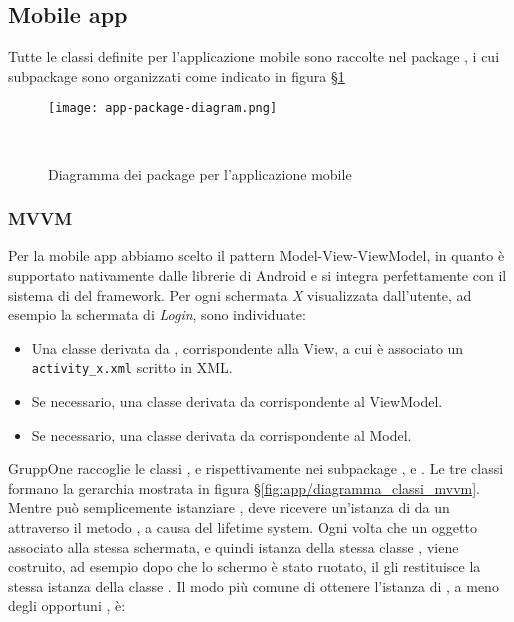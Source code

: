 \documentclass[../../manuale-manutentore.tex]{subfiles}
\begin{document}
\subsection{Mobile app}%
\label{sub:mobile_app}

Tutte le classi definite per l'applicazione mobile sono raccolte nel package , i cui subpackage sono organizzati come indicato in figura §\ref{fig:app/diagramma_package}
\begin{figure}[ht]
  \centering
  \texttt{[image: app-package-diagram.png]}
  \caption{Diagramma dei package per l'applicazione mobile}
~~\label{fig:app/diagramma_package}
\end{figure}

\subsubsection{MVVM}%
\label{subs:mvvm}

Per la mobile app abbiamo scelto il pattern Model-View-ViewModel, in quanto è supportato nativamente dalle librerie di Android e si integra perfettamente con il sistema di  del framework. Per ogni schermata \textit{X} visualizzata dall'utente, ad esempio la schermata di \textit{Login}, sono individuate:
\begin{itemize}
  \item Una classe  derivata da , corrispondente alla View, a cui è associato un  \linebreak[1]\texttt{activity\_x.xml} scritto in XML\@.
  \item Se necessario, una classe  derivata da  corrispondente al ViewModel.
  \item Se necessario, una classe  derivata da  corrispondente al Model.
\end{itemize}

GruppOne raccoglie le classi ,  e  rispettivamente nei subpackage ,  e .
Le tre classi formano la gerarchia mostrata in figura §\ref{fig:app/diagramma_classi_mvvm}.
Mentre  può semplicemente istanziare ,  deve ricevere un'istanza di  da un  attraverso il metodo , a causa del lifetime system.
Ogni volta che un oggetto associato alla stessa schermata, e quindi istanza della stessa classe , viene costruito, ad esempio dopo che lo schermo è stato ruotato, il  gli restituisce la stessa istanza della classe .
Il modo più comune di ottenere l'istanza di , a meno degli opportuni , è:
\end{document}
